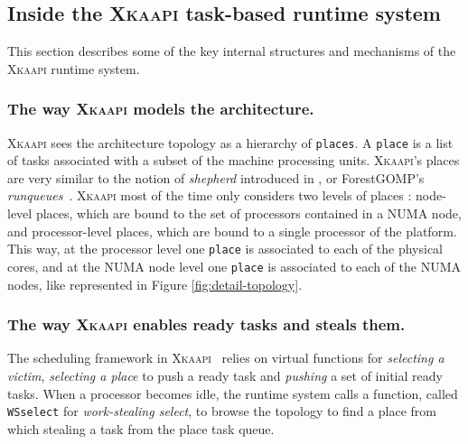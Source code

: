 \documentclass{Styles/llncs}
\newcommand{\kaapi}{\textsc{\mbox{Xkaapi}}\xspace}
\begin{document}
\subsection{Inside the \kaapi task-based runtime system}

This section describes some of the key internal structures and mechanisms of the \kaapi runtime system.

\subsubsection{The way \kaapi models the architecture.}


\kaapi sees the architecture topology as a hierarchy of \verb/places/.
A \verb/place/ is a list of tasks associated with a subset of the machine processing units.
\kaapi's places are very similar to the notion of \emph{shepherd} introduced in \cite{DBLP:journals/ijhpca/OlivierPWSP12}, or ForestGOMP's \emph{runqueues}~\cite{BroFurGogWacNam10IJPP}.
\kaapi most of the time only considers two levels of places : node-level places, which are bound to the set of processors contained in a NUMA node, and processor-level places, which are bound to a single processor of the platform.
This way, at the processor level one \verb/place/ is associated to each of the physical cores, and
at the NUMA node level one \verb/place/ is associated to each of the NUMA nodes, like represented in
Figure \ref{fig:detail-topology}.


\subsubsection{The way \kaapi enables ready tasks and steals them.}
The scheduling framework in \kaapi~\cite{Bleuse2014} relies on virtual functions for \textit{selecting a victim}, \textit{selecting a place} to push a ready task and \textit{pushing} a set of initial ready tasks.
When a processor becomes idle, the runtime system calls a function, called  \verb/WSselect/ for \emph{work-stealing select}, to browse the topology to find a place from which stealing a task from the place task queue.
\end{document}
